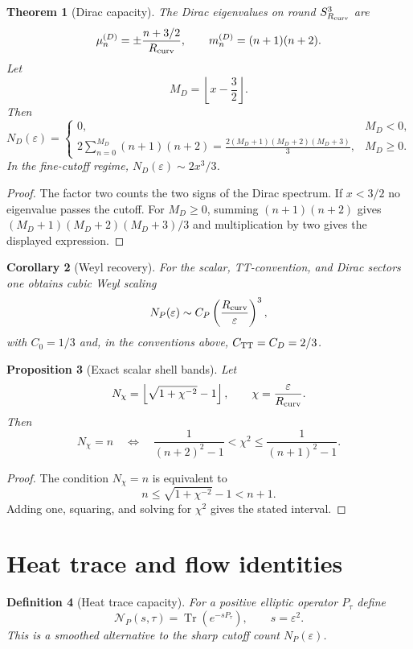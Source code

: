 \documentclass[11pt,a4paper]{article}
\newtheorem{theorem}{Theorem}[section]
\newtheorem{proposition}[theorem]{Proposition}
\newtheorem{corollary}[theorem]{Corollary}
\newtheorem{definition}[theorem]{Definition}
\newcommand{\Tr}{\operatorname{Tr}}
\begin{document}
\begin{theorem}[Dirac capacity]
The Dirac eigenvalues on round $S^3_{R_{\rm curv}}$ are
\[
\mu_n^{(D)}=\pm\frac{n+3/2}{R_{\rm curv}},
\qquad
m_n^{(D)}=(n+1)(n+2).
\]
Let
\[
M_D=\left\lfloor x-\frac32\right\rfloor.
\]
Then
\[
N_D(\varepsilon)=
\begin{cases}
0, & M_D<0,\\[0.4em]
\displaystyle
2\sum_{n=0}^{M_D}(n+1)(n+2)
=
\frac{2(M_D+1)(M_D+2)(M_D+3)}{3},
& M_D\ge0.
\end{cases}
\]
In the fine-cutoff regime, $N_D(\varepsilon)\sim2x^3/3$.
\end{theorem}
\begin{proof}
The factor two counts the two signs of the Dirac spectrum.  If $x<3/2$ no eigenvalue passes the cutoff.  For $M_D\ge0$, summing $(n+1)(n+2)$ gives $(M_D+1)(M_D+2)(M_D+3)/3$ and multiplication by two gives the displayed expression.
\end{proof}

\begin{corollary}[Weyl recovery]
For the scalar, TT-convention, and Dirac sectors one obtains cubic Weyl scaling~\cite{Weyl1911}
\[
N_P(\varepsilon)\sim C_P\left(\frac{R_{\rm curv}}{\varepsilon}\right)^3,
\]
with $C_0=1/3$ and, in the conventions above, $C_{\rm TT}=C_D=2/3$.
\end{corollary}




\begin{proposition}[Exact scalar shell bands]
\label{prop:exact-scalar-shell-bands}
Let
\[
N_\chi=\left\lfloor\sqrt{1+\chi^{-2}}-1\right\rfloor,
\qquad
\chi=\frac{\varepsilon}{R_{\rm curv}}.
\]
Then
\[
N_\chi=n\quad\Longleftrightarrow\quad
\frac{1}{(n+2)^2-1}<\chi^2\le\frac{1}{(n+1)^2-1}.
\]
\end{proposition}
\begin{proof}
The condition $N_\chi=n$ is equivalent to
\[
n\le\sqrt{1+\chi^{-2}}-1<n+1.
\]
Adding one, squaring, and solving for $\chi^2$ gives the stated interval.
\end{proof}

\section{Heat trace and flow identities}

\begin{definition}[Heat trace capacity]
For a positive elliptic operator $P_\tau$ define
\[
\mathcal N_P(s,\tau)=\Tr(e^{-sP_\tau}),
\qquad s=\varepsilon^2.
\]
This is a smoothed alternative to the sharp cutoff count $N_P(\varepsilon)$.
\end{definition}
\end{document}
